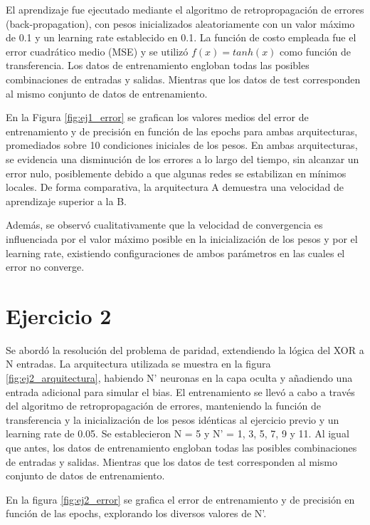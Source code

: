 \documentclass[aps,prb,twocolumn,superscriptaddress,floatfix,longbibliography]{revtex4-2}
\newcounter{para}
\begin{document}
El aprendizaje fue ejecutado mediante el algoritmo de retropropagación de errores (back-propagation), con pesos inicializados aleatoriamente con un valor máximo de 0.1 y un learning rate establecido en 0.1. La función de costo empleada fue el error cuadrático medio (MSE) y se utilizó $f(x) = tanh(x)$ como función de transferencia. Los datos de entrenamiento engloban todas las posibles combinaciones de entradas y salidas. Mientras que los datos de test corresponden al mismo conjunto de datos de entrenamiento.

En la Figura \ref{fig:ej1_error} se grafican los valores medios del error de entrenamiento y de precisión en función de las epochs para ambas arquitecturas, promediados sobre 10 condiciones iniciales de los pesos. En ambas arquitecturas, se evidencia una disminución de los errores a lo largo del tiempo, sin alcanzar un error nulo, posiblemente debido a que algunas redes se estabilizan en mínimos locales. De forma comparativa, la arquitectura A demuestra una velocidad de aprendizaje superior a la B.


Además, se observó cualitativamente que la velocidad de convergencia es influenciada por el valor máximo posible en la inicialización de los pesos y por el learning rate, existiendo configuraciones de ambos parámetros en las cuales el error no converge.

\section*{Ejercicio 2}



Se abordó la resolución del problema de paridad, extendiendo la lógica del XOR a N entradas. La arquitectura utilizada se muestra en la figura \ref{fig:ej2_arquitectura}, habiendo N' neuronas en la capa oculta y añadiendo una entrada adicional para simular el bias. El entrenamiento se llevó a cabo a través del algoritmo de retropropagación de errores, manteniendo la función de transferencia y la inicialización de los pesos idénticas al ejercicio previo y un learning rate de 0.05. Se establecieron N = 5 y N' = 1, 3, 5, 7, 9 y 11. Al igual que antes, los datos de entrenamiento engloban todas las posibles combinaciones de entradas y salidas. Mientras que los datos de test corresponden al mismo conjunto de datos de entrenamiento.


En la figura \ref{fig:ej2_error} se grafica el error de entrenamiento y de precisión en función de las epochs, explorando los diversos valores de N'.
\end{document}
